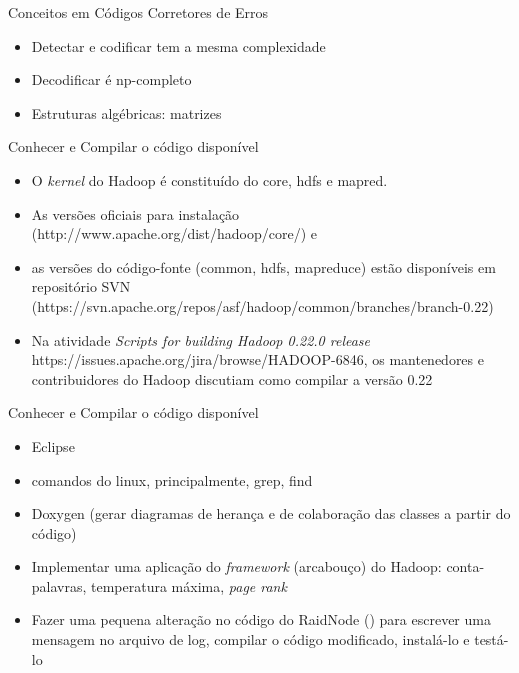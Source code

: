   \begin{frame}{Conceitos em Códigos Corretores de Erros}
     \begin{itemize}
        \item<1-> Detectar e codificar tem a mesma complexidade 
        \item<2-> Decodificar é np-completo
        \item<3-> Estruturas algébricas: matrizes
     \end{itemize}
  \end{frame}

  \begin{frame}{Conhecer e Compilar o código disponível}
     \begin{itemize}
        \item<1-> O \emph{kernel} do Hadoop é constituído do core, hdfs e mapred.
        \item<2-> As versões oficiais para instalação (http://www.apache.org/dist/hadoop/core/) e
        \item<3-> as versões do código-fonte (common, hdfs, mapreduce) estão disponíveis em repositório SVN (https://svn.apache.org/repos/asf/hadoop/common/branches/branch-0.22) 
        \item<4-> Na atividade \emph{Scripts for building Hadoop 0.22.0 release}  https://issues.apache.org/jira/browse/HADOOP-6846, os mantenedores e contribuidores do Hadoop discutiam como compilar a versão 0.22
     \end{itemize}
  \end{frame}

  \begin{frame}{Conhecer e Compilar o código disponível}
     \begin{itemize}
        \item<1-> Eclipse
        \item<2-> comandos do linux, principalmente, grep, find
        \item<3-> Doxygen (gerar diagramas de herança e de colaboração das classes a partir do código)
        \item<4-> Implementar uma aplicação do \emph{framework} (arcabouço) do Hadoop: conta-palavras, temperatura máxima, \emph{page rank}
        \item<5-> Fazer uma pequena alteração no código do RaidNode () para escrever uma mensagem no arquivo de log, compilar o código modificado, instalá-lo e testá-lo
     \end{itemize}
  \end{frame}

